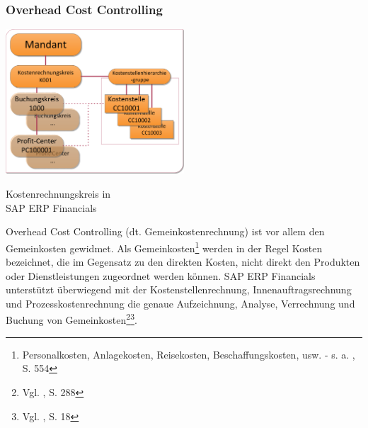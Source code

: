 \subsubsection{Overhead Cost Controlling}
\begin{floatingfigure}[htbpr]{0.5\textwidth} 
\includegraphics[width=0.5\textwidth]{Images/kostenRechnungskreis.png}
\begin{flushright}
   \caption[Kostenrechnungskreis in SAP ERP Financials]{Kostenrechnungskreis in \\SAP ERP Financials}\label{abb4}
\end{flushright}
\end{floatingfigure}\noindent
Overhead Cost Controlling (dt. Gemeinkostenrechnung) ist vor allem den Gemeinkosten gewidmet. Als Gemeinkosten\footnote{Personalkosten, Anlagekosten, Reisekosten, Beschaffungskosten, usw. - s. a. \cite{Baier2009}, S. 554} werden in der Regel Kosten bezeichnet, die im Gegensatz zu den direkten Kosten, nicht direkt den Produkten oder Dienstleistungen zugeordnet werden können. SAP ERP Financials unterstützt überwiegend mit der Kostenstellenrechnung, Innenauftragsrechnung und Prozesskostenrechnung die genaue Aufzeichnung, Analyse, Verrechnung und Buchung von Gemeinkosten\footnote{Vgl. \cite{Patel2009}, S. 288}\footnote{Vgl. \cite{SAPCOOMCCA2001}, S. 18}. 

